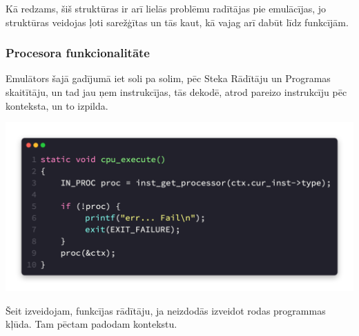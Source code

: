 \documentclass[12pt]{article}
\begin{document}
	Kā redzams, šiš struktūras ir arī lielās problēmu radītājas pie emulācījas, jo struktūras veidojas ļoti sarežģītas un tās kaut, kā vajag arī dabūt līdz funkcījām.
	
	\pagebreak
	
	\subsubsection{Procesora funkcionalitāte}
	
	Emulātors šajā gadījumā iet soli pa solim, pēc Steka Rādītāju un Programas skaitītāju, un tad jau ņem instrukcījas, tās dekodē, atrod pareizo instrukcīju pēc konteksta, un to izpilda.
	
	\includegraphics[scale=0.5]{img/cpu_exec.png}
	
	Šeit izveidojam, funkcījas rādītāju, ja neizdodās izveidot rodas programmas kļūda. Tam pēctam padodam kontekstu. 
	
\end{document}
